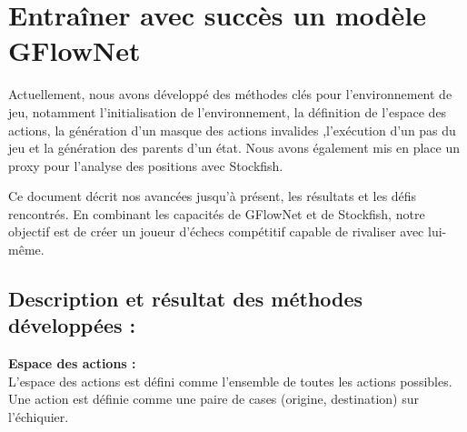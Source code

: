 \documentclass[11pt]{article}
\begin{document}
\section{Entraîner avec succès un modèle GFlowNet}
Actuellement, nous avons développé des méthodes clés pour
l'environnement de jeu, notamment l'initialisation de l'environnement,
la définition de l'espace des actions, la génération d'un masque des
actions invalides ,l'exécution d'un pas du jeu et la génération des
parents d'un état. Nous avons également mis en place un proxy pour
l'analyse des positions avec Stockfish.

Ce document décrit nos avancées jusqu'à présent, les résultats et les
défis rencontrés. En combinant les capacités de GFlowNet et de
Stockfish, notre objectif est de créer un joueur d'échecs compétitif
capable de rivaliser avec lui-même.
\subsection*{Description et résultat des méthodes développées :}





\textbf{Espace des actions :} \\
L'espace des actions est défini comme l'ensemble de toutes les actions
possibles. Une action est définie comme une paire de cases (origine,
destination) sur l'échiquier.
\end{document}

